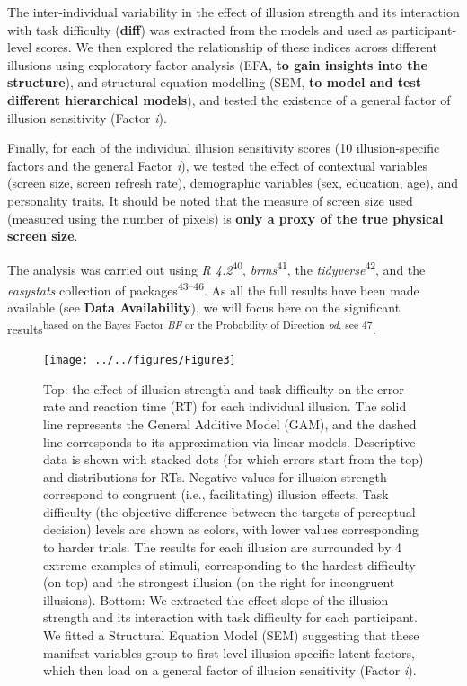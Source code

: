\documentclass[
  man,floatsintext]{apa6}
\begin{document}
The inter-individual variability in the effect of illusion strength and its interaction with task difficulty (\textbf{diff}) was extracted from the models and used as participant-level scores. We then explored the relationship of these indices across different illusions using exploratory factor analysis (EFA, \textbf{to gain insights into the structure}), and structural equation modelling (SEM, \textbf{to model and test different hierarchical models}), and tested the existence of a general factor of illusion sensitivity (Factor \emph{i}).

Finally, for each of the individual illusion sensitivity scores (10 illusion-specific factors and the general Factor \emph{i}), we tested the effect of contextual variables (screen size, screen refresh rate), demographic variables (sex, education, age), and personality traits. It should be noted that the measure of screen size used (measured using the number of pixels) is \textbf{only a proxy of the true physical screen size}.

The analysis was carried out using \emph{R 4.2}\textsuperscript{40}, \emph{brms}\textsuperscript{41}, the \emph{tidyverse}\textsuperscript{42}, and the \emph{easystats} collection of packages\textsuperscript{43--46}. As all the full results have been made available (see \textbf{Data Availability}), we will focus here on the significant results\textsuperscript{based on the Bayes Factor \emph{BF} or the Probability of Direction \emph{pd}, see 47}.

\begin{figure}
\texttt{[image: ../../figures/Figure3]} \caption{Top: the effect of illusion strength and task difficulty on the error rate and reaction time (RT) for each individual illusion. The solid line represents the General Additive Model (GAM), and the dashed line corresponds to its approximation via linear models. Descriptive data is shown with stacked dots (for which errors start from the top) and distributions for RTs. Negative values for illusion strength correspond to congruent (i.e., facilitating) illusion effects. Task difficulty (the objective difference between the targets of perceptual decision) levels are shown as colors, with lower values corresponding to harder trials. The results for each illusion are surrounded by 4 extreme examples of stimuli, corresponding to the hardest difficulty (on top) and the strongest illusion (on the right for incongruent illusions). Bottom: We extracted the effect slope of the illusion strength and its interaction with task difficulty for each participant. We fitted a Structural Equation Model (SEM) suggesting that these manifest variables group to first-level illusion-specific latent factors, which then load on a general factor of illusion sensitivity (Factor \textit{i}).}\label{fig:unnamed-chunk-4}
\end{figure}
\end{document}
